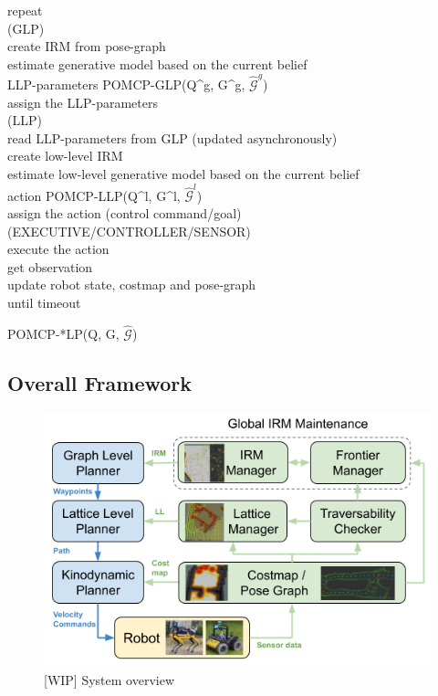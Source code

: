\documentclass{article}
\begin{document}
repeat\\
    (GLP)\\
    create IRM from pose-graph\\
    estimate generative model based on the current belief\\
    LLP-parameters \gets POMCP-GLP(Q^g, G^g, $\hat{\mathcal{G}}^g$)\\
    assign the LLP-parameters\\
    
    (LLP)\\
    read LLP-parameters from GLP (updated asynchronously)\\
    create low-level IRM\\
    estimate low-level generative model based on the current belief\\
    action \gets POMCP-LLP(Q^l, G^l, $\hat{\mathcal{G}}^l$)\\
    assign the action (control command/goal)\\

    (EXECUTIVE/CONTROLLER/SENSOR)\\
    execute the action\\
    get observation\\
    update robot state, costmap and pose-graph\\
until timeout


POMCP-*LP(Q, G, $\hat{\mathcal{G}}$)
\fi %







\subsection{Overall Framework} 



\begin{figure}[t!]
  \centering
  \includegraphics[width=.6\textwidth]{figures/SystemOverview.png}
  \caption{[WIP] System overview}
  \label{fig:system_overview}
\end{figure}
\end{document}
